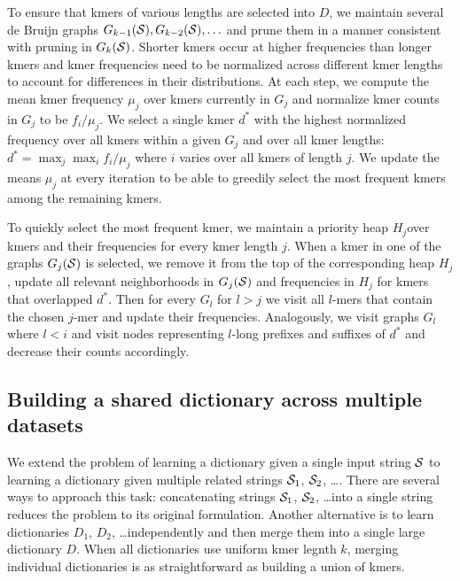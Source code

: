 \documentclass[12pt]{cmuthesis}
\begin{document}
  To ensure that kmers of various lengths are selected into $D$, we maintain several de Bruijn graphs $G_{k-1}(\mathcal{S}), G_{k-2}(\mathcal{S}), \ldots$ and prune them in a manner consistent with pruning in $G_{k}(\mathcal{S})$. Shorter kmers occur at higher frequencies than longer kmers and kmer frequencies need to be normalized across different kmer lengths to account for differences in their distributions. At each step, we compute the mean kmer frequency $\mu_j$ over kmers currently in $G_{j}$ and normalize kmer counts in $G_j$ to be $f_i / \mu_j$. We select a single kmer $d^*$ with the highest normalized frequency over all kmers within a given $G_j$ and over all kmer lengths: $d^* = \max_j \max_i f_i / \mu_j$ where $i$ varies over all kmers of length $j$. We update the means $\mu_j$ at every iteration to be able to greedily select the most frequent kmers among the remaining kmers.

  To quickly select the most frequent kmer, we maintain a priority heap $H_j$over kmers and their frequencies for every kmer length $j$. When a kmer in one of the graphs $G_{j}(\mathcal{S})$ is selected, we remove it from the top of the corresponding heap $H_j$, update all relevant neighborhoods in $G_{j}(\mathcal{S})$ and frequencies in $H_j$ for kmers that overlapped $d^*$. Then for every $G_l$ for $l > j$ we visit all $l$-mers that contain the chosen $j$-mer and update their frequencies. Analogously, we visit graphs $G_l$ where $l < i$ and visit nodes representing $l$-long prefixes and suffixes of $d^*$ and decrease their counts accordingly.


  \subsection{Building a shared dictionary across multiple datasets}

  We extend the problem of learning a dictionary given a single input string $\mathcal{S}$ to learning a dictionary given multiple related strings $\mathcal{S}_1$, $\mathcal{S}_2$, \ldots. There are several ways to approach this task: concatenating strings $\mathcal{S}_1$, $\mathcal{S}_2$, \ldots into a single string reduces the problem to its original formulation. Another alternative is to learn dictionaries $D_1$, $D_2$, \ldots independently and then merge them into a single large dictionary $D$. When all dictionaries use uniform kmer legnth $k$, merging individual dictionaries is as straightforward as building a union of kmers. 
\end{document}
